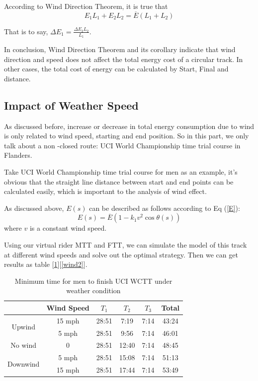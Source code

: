 \par According to Wind Direction Theorem, it is true that
\begin{equation}
	E_1L_1+E_2L_2=\overline{E}(L_1+L_2)
\end{equation}
\par That is to say, $\Delta E_1 = \frac{\Delta E_2L_2}{L_1}$.
\par In conclusion, Wind Direction Theorem and its corollary indicate that wind direction and speed does not affect the total energy cost of a circular track. In other cases, the total cost of energy can be calculated by Start, Final and distance.
\subsection{Impact of Weather Speed}
As discussed before, increase or decrease in total energy consumption due to wind is only related to wind speed, starting and end position. So in this part, we only talk about a non -closed route: UCI World Championship time trial course in Flanders.
\par Take UCI World Championship time trial course for men as an example, it's obvious that the straight line distance between start and end points can be calculated easily, which is important to the analysis of wind effect.
\par As discussed above, $E(s)$ can be described as follows according to Eq (\ref{E}):
\begin{equation}
	E(s) = \overline{E}(1-k_1v^2\cos\theta(s))
\end{equation}
where $v$ is a constant wind speed. 
\par Using our virtual rider MTT and FTT, we can simulate the model of this track at different wind speeds and solve out the optimal strategy. Then we can get results as table [\ref{wind}][\ref{wind2}].
\begin{table}[h]
	\setlength\tabcolsep{13pt}%
	\setlength{\belowcaptionskip}{0.2cm}
	\centering
	\caption{Minimum time for men to finish UCI WCTT under weather condition}
	\begin{tabular}{c|ccccc}
		\toprule[2pt]
		& Wind Speed & $T_1$  & $T_2$  & $T_3$  & Total \\
		\midrule
		\multirow{2}[2]{*}{Upwind} & 15 mph    & 28:51 & 7:19  & 7:14  & 43:24 \\
		& 5 mph    & 28:51 & 9:56  & 7:14  & 46:01 \\
		\midrule
		No wind & 0     & 28:51 & 12:40 & 7:14  & 48:45 \\
		\midrule
		\multirow{2}[2]{*}{Downwind} & 5 mph     & 28:51 & 15:08 & 7:14  & 51:13 \\
		& 15 mph     & 28:51 & 17:44 & 7:14  & 53:49 \\
		\bottomrule[2pt]
	\end{tabular}%
	\label{wind}%
\end{table}%

